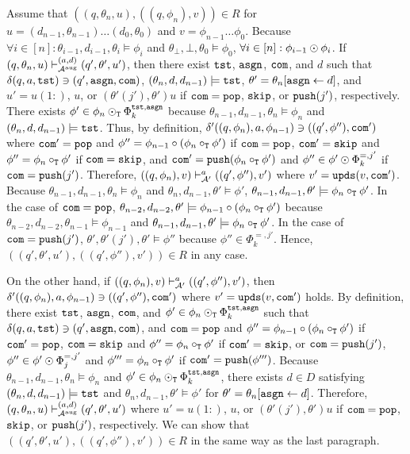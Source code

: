 Assume that
$((q,\theta_n,u),\allowbreak ((q,\phi_n),v))\in R$
for $u=(d_{n-1},\theta_{n-1})\ldots(d_0,\theta_0)$ and
$v=\phi_{n-1}\ldots\phi_0$.
Because
$\forall i\in[n]: \theta_{i-1},d_{i-1},\theta_i\models\phi_i$ and
$\theta_{\bot},{\bot},\theta_0\models\phi_0$,
$\forall i\in[n]: \phi_{i-1}\odot\phi_i$.
%
If
$(q,\theta_n,u)\vdash_{{\cal A}^{\mathrm{aug}}}^{(a,d)}(q',\theta',u')$,
then
there exist $\mathtt{tst}$, $\mathtt{asgn}$, $\mathtt{com}$, and $d$ such that
$\delta(q,a,\mathtt{tst})\ni (q',\mathtt{asgn},\mathtt{com})$,
$(\theta_n,d,d_{n-1})\models\mathtt{tst}$,
$\theta'=\theta_n[\mathtt{asgn}\gets d]$, and
$u'=u(1{:})$, $u$, or
$(\theta'(j'),\theta')u$
if $\mathtt{com}=\mathtt{pop}$, $\mathtt{skip}$, or $\mathtt{push}(j')$, respectively.
There exists $\phi'\in\phi_n\odot_{\mathtt{T}}\Phi_k^{\mathtt{tst},\mathtt{asgn}}$ because
$\theta_{n-1},d_{n-1},\theta_n\models\phi_n$ and
$(\theta_n,d,d_{n-1})\models\mathtt{tst}$.
Thus, by definition,
$\delta'((q,\phi_n),a,\phi_{n-1})\allowbreak\ni ((q',\phi''),\mathtt{com}')$
where $\mathtt{com}'=\mathtt{pop}$ and $\phi''=\phi_{n-1}\circ(\phi_n\circ_{\mathtt{T}}\phi')$
if $\mathtt{com}=\mathtt{pop}$,
$\mathtt{com}'=\mathtt{skip}$ and $\phi''=\phi_n\circ_{\mathtt{T}}\phi'$ if $\mathtt{com}=\mathtt{skip}$, and
$\mathtt{com}'=\mathtt{push}(\phi_n\circ_{\mathtt{T}}\phi')$ and $\phi''\in\phi'\odot\Phi_k^{=,j'}$
if $\mathtt{com}=\mathtt{push}(j')$.
Therefore,
$((q,\phi_n),v)\vdash_{{\cal A}'}^a ((q',\phi''),v')$
where $v'=\mathtt{upds}(v,\mathtt{com}')$.
Because $\theta_{n-1},d_{n-1},\theta_n\models\phi_n$ and
$\theta_n,d_{n-1},\theta'\models\phi'$,
$\theta_{n-1},d_{n-1},\theta'\models\phi_n\circ_{\mathtt{T}}\phi'$.
In the case of $\mathtt{com}=\mathtt{pop}$,
$\theta_{n-2},d_{n-2},\theta'\models\phi_{n-1}\circ(\phi_n\circ_{\mathtt{T}}\phi')$
because $\theta_{n-2},d_{n-2},\theta_{n-1}\models\phi_{n-1}$ and
$\theta_{n-1},d_{n-1},\theta'\models\phi_n\circ_{\mathtt{T}}\phi'$.
In the case of $\mathtt{com}=\mathtt{push}(j')$,
$\theta',\theta'(j'),\theta'\models\phi''$
because $\phi''\in\Phi_k^{=,j'}$.
Hence, $((q',\theta',u'),((q',\phi''),\allowbreak v'))\in R$ in any case.

On the other hand,
if $((q,\phi_n),v)\vdash_{{\cal A}'}^a ((q',\phi''),v')$, then
$\delta'((q,\phi_n),a,\allowbreak
\phi_{n-1})\ni ((q',\phi''),\mathtt{com}')$
where $v'=\mathtt{upds}(v,\mathtt{com}')$ holds.
By definition,
there exist $\mathtt{tst}$, $\mathtt{asgn}$, $\mathtt{com}$, and
$\phi'\in\phi_n\odot_{\mathtt{T}}\Phi_k^{\mathtt{tst},\mathtt{asgn}}$ such that
$\delta(q,a,\mathtt{tst})\ni(q',\mathtt{asgn},\mathtt{com})$, and
$\mathtt{com}=\mathtt{pop}$ and $\phi''=\phi_{n-1}\circ(\phi_n\circ_{\mathtt{T}}\phi')$
if $\mathtt{com}'=\mathtt{pop}$,
$\mathtt{com}=\mathtt{skip}$ and $\phi''=\phi_n\circ_{\mathtt{T}}\phi'$ if $\mathtt{com}'=\mathtt{skip}$,
or
$\mathtt{com}=\mathtt{push}(j')$, $\phi''\in\phi'\odot\Phi_j^{=,j'}$
and $\phi'''=\phi_n\circ_{\mathtt{T}}\phi'$ if $\mathtt{com}'=\mathtt{push}(\phi''')$.
Because $\theta_{n-1},d_{n-1},\theta_n\models\phi_n$ and
$\phi'\in\phi_n\odot_{\mathtt{T}}\Phi_k^{\mathtt{tst},\mathtt{asgn}}$,
there exists $d\in D$ satisfying
$(\theta_n,d,d_{n-1})\models\mathtt{tst}$ and
$\theta_n,d_{n-1},\theta'\models\phi'$
for $\theta'=\theta_n[\mathtt{asgn}\gets d]$.
Therefore,
$(q,\theta_n,u)\vdash_{{\cal A}^{\mathrm{aug}}}^{(a,d)} (q',\theta',u')$
where
$u'=u(1{:})$, $u$, or
$(\theta'(j'),\theta')u$
if $\mathtt{com}=\mathtt{pop}$, $\mathtt{skip}$, or $\mathtt{push}(j')$, respectively.
We can show that $((q',\theta',u'),((q',\phi''),v'))\in R$
in the same way as the last paragraph.



